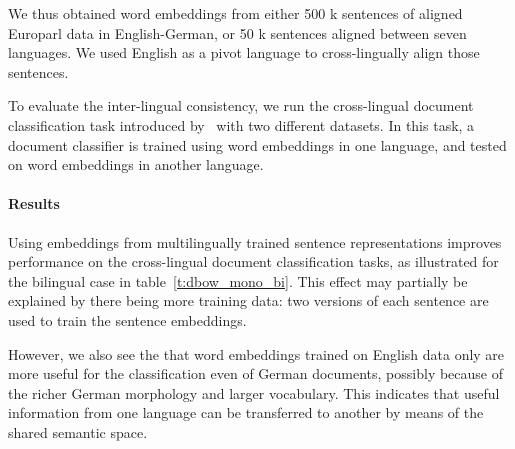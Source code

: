 \documentclass[a4paper,11pt]{article}
\begin{document}
We thus obtained word embeddings from either 500 k sentences of aligned Europarl data in English-German, or 50 k sentences aligned between seven languages. We used English as a pivot language to cross-lingually align those sentences.


To evaluate the inter-lingual consistency, we run the cross-lingual document classification task introduced by~\cite{klementiev2012inducing} with two different datasets. In this task, a document classifier is trained using word embeddings in one language, and tested on word embeddings in another language. 


\paragraph{Results}
Using embeddings from multilingually trained sentence representations improves performance on the cross-lingual document classification tasks, as illustrated for the bilingual case in table~\ref{t:dbow_mono_bi}. This effect may partially be explained by there being more training data: two versions of each sentence are used to train the sentence embeddings. 

However, we also see the that word embeddings trained on English data only are more useful for the classification even of German documents, possibly because of the richer German morphology and larger vocabulary. This indicates that useful information from one language can be transferred to another by means of the shared semantic space.
\end{document}
